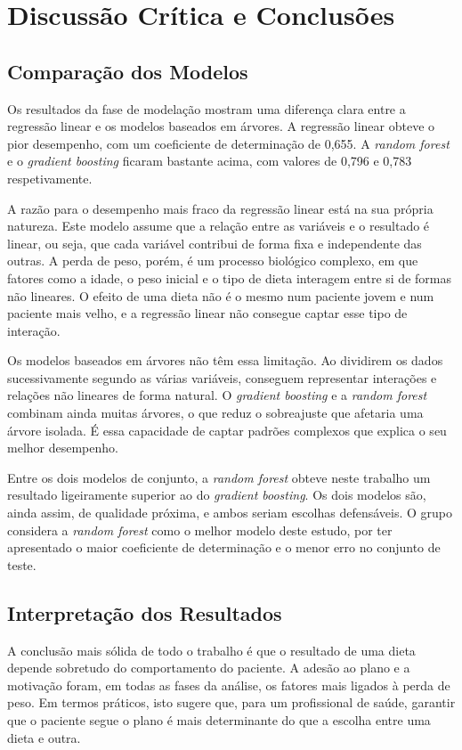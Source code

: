 \chapter{Discussão Crítica e Conclusões}
\label{chap:conclusoes}

\section{Comparação dos Modelos}
Os resultados da fase de modelação mostram uma diferença clara entre a regressão linear e os modelos baseados em árvores. A regressão linear obteve o pior desempenho, com um coeficiente de determinação de 0,655. A \textit{random forest} e o \textit{gradient boosting} ficaram bastante acima, com valores de 0,796 e 0,783 respetivamente.

A razão para o desempenho mais fraco da regressão linear está na sua própria natureza. Este modelo assume que a relação entre as variáveis e o resultado é linear, ou seja, que cada variável contribui de forma fixa e independente das outras. A perda de peso, porém, é um processo biológico complexo, em que fatores como a idade, o peso inicial e o tipo de dieta interagem entre si de formas não lineares. O efeito de uma dieta não é o mesmo num paciente jovem e num paciente mais velho, e a regressão linear não consegue captar esse tipo de interação.

Os modelos baseados em árvores não têm essa limitação. Ao dividirem os dados sucessivamente segundo as várias variáveis, conseguem representar interações e relações não lineares de forma natural. O \textit{gradient boosting} e a \textit{random forest} combinam ainda muitas árvores, o que reduz o sobreajuste que afetaria uma árvore isolada. É essa capacidade de captar padrões complexos que explica o seu melhor desempenho.

Entre os dois modelos de conjunto, a \textit{random forest} obteve neste trabalho um resultado ligeiramente superior ao do \textit{gradient boosting}. Os dois modelos são, ainda assim, de qualidade próxima, e ambos seriam escolhas defensáveis. O grupo considera a \textit{random forest} como o melhor modelo deste estudo, por ter apresentado o maior coeficiente de determinação e o menor erro no conjunto de teste.

\section{Interpretação dos Resultados}
A conclusão mais sólida de todo o trabalho é que o resultado de uma dieta depende sobretudo do comportamento do paciente. A adesão ao plano e a motivação foram, em todas as fases da análise, os fatores mais ligados à perda de peso. Em termos práticos, isto sugere que, para um profissional de saúde, garantir que o paciente segue o plano é mais determinante do que a escolha entre uma dieta e outra.

